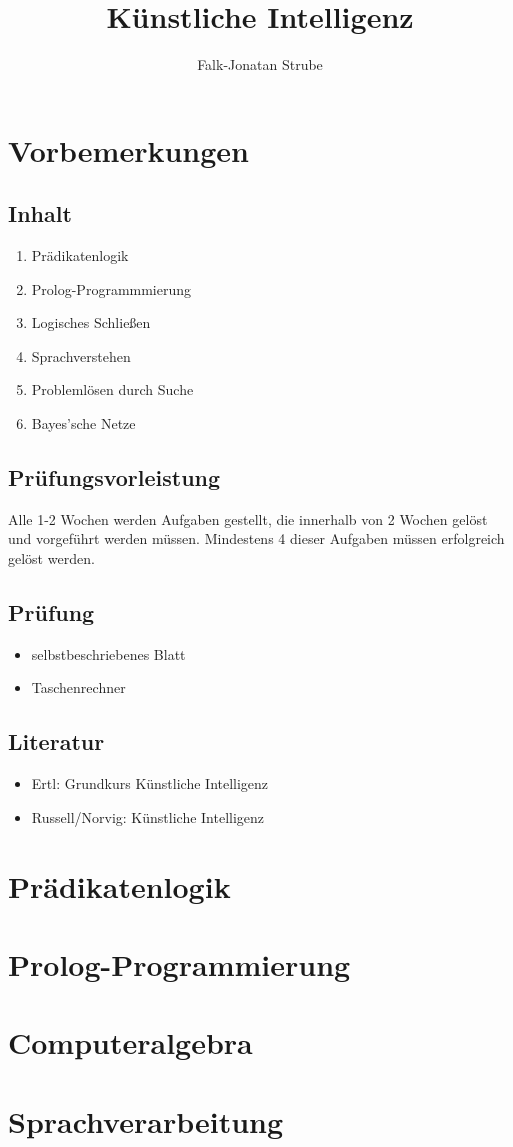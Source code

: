 \documentclass{scrreprt}
\title{Künstliche Intelligenz}
\author{Falk-Jonatan Strube}
\begin{document}
\maketitle
\tableofcontents

\chapter*{Vorbemerkungen}
\section*{Inhalt}
\begin{enumerate}
\item Prädikatenlogik
\item Prolog-Programmmierung
\item Logisches Schließen
\item Sprachverstehen
\item Problemlösen durch Suche
\item Bayes'sche Netze
\end{enumerate}

\section*{Prüfungsvorleistung}
Alle 1-2 Wochen werden Aufgaben gestellt, die innerhalb von 2 Wochen gelöst und vorgeführt werden müssen. Mindestens 4 dieser Aufgaben müssen erfolgreich gelöst werden.

\section*{Prüfung}
\begin{itemize}
\item selbstbeschriebenes Blatt
\item Taschenrechner
\end{itemize}

\section*{Literatur}
\begin{itemize}
\item Ertl: Grundkurs Künstliche Intelligenz
\item Russell/Norvig: Künstliche Intelligenz
\end{itemize}

\chapter{Prädikatenlogik}


\chapter{Prolog-Programmierung}


\chapter{Computeralgebra}


\chapter{Sprachverarbeitung}



\end{document}
